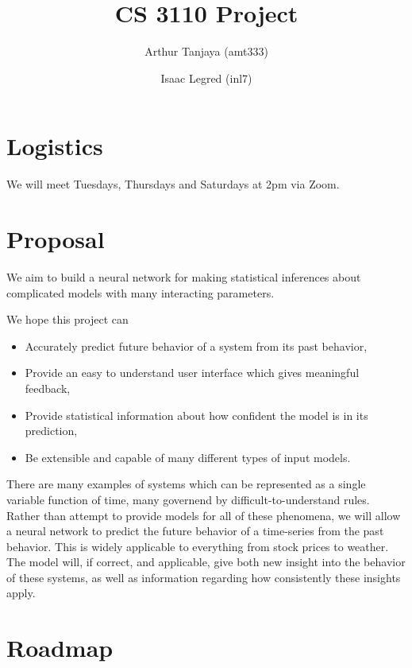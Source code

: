 \documentclass{article}
\author{Arthur Tanjaya (amt333) \and Isaac Legred (inl7)}
\title{CS 3110 Project}
\begin{document}
\maketitle

\section{Logistics}

We will meet Tuesdays, Thursdays and Saturdays at 2pm via Zoom.

\section{Proposal}

We aim to build a neural network for making statistical inferences about complicated models with many
interacting parameters.

We hope this project can
\begin{itemize}
  \item Accurately predict future behavior of a system from its past behavior,
  \item Provide an easy to understand user interface which gives meaningful feedback,
  \item Provide statistical information about how confident the model is in its prediction,
  \item Be extensible and capable of many different types of input models.
\end{itemize}

There are many examples of systems which can be represented as a single variable function of time, many
governend by difficult-to-understand rules.  Rather than attempt to provide models for all of these
phenomena, we will allow a neural network to predict the future behavior of a time-series from the past behavior. This is widely applicable to everything from stock prices to weather.  The model will, if correct, and applicable, give both new insight into the behavior of these systems, as well as information regarding how consistently these insights apply.  
  

\section{Roadmap}
\end{document}

